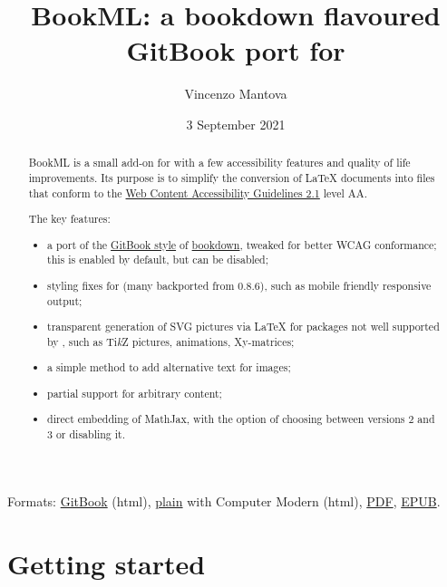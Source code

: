 \documentclass[a4paper,british]{article}
\title{BookML: a bookdown flavoured GitBook port for \texorpdfstring{\LaTeXML{}}{LaTeXML}}
\author{Vincenzo Mantova}
\date{3 September 2021}
\def\Xy{Xy}
\def\tikzname{Ti\emph{k}Z}
\begin{document}
\maketitle

\begin{abstract}
  BookML is a small add-on for \LaTeXML{} with a few accessibility features and quality of life improvements. Its purpose is to simplify the conversion of \LaTeX{} documents into \HTML{} files that conform to the \href{https://www.w3.org/TR/WCAG21/}{Web Content Accessibility Guidelines 2.1} level AA.

  The key features:
  \begin{itemize}
    \item a port of the \href{https://bookdown.org/yihui/bookdown/html.html#gitbook-style}{GitBook style} of \href{https://bookdown.org}{bookdown}, tweaked for better WCAG conformance; this is enabled by default, but can be disabled;
    \item styling fixes for \LaTeXML{} (many backported from 0.8.6), such as mobile friendly responsive output;
    \item transparent generation of SVG pictures via \LaTeX{} for packages not well supported by \LaTeXML{}, such as \tikzname{} pictures, animations, \Xy-matrices;
    \item a simple method to add alternative text for images;
    \item partial support for arbitrary \HTML{} content;
    \item direct embedding of MathJax, with the option of choosing between versions 2 and 3 or disabling it.
  \end{itemize}
\end{abstract}

\begin{center}
  Formats: \href{https://vlmantova.github.io/bookml/}{GitBook} (html), \href{https://vlmantova.github.io/bookml/index.plain.html}{plain} with Computer Modern (html), \href{https://vlmantova.github.io/bookml/docs.pdf}{PDF}, \href{https://vlmantova.github.io/bookml/docs.epub}{EPUB}.
\end{center}

\tableofcontents

\section{Getting started}
\end{document}
